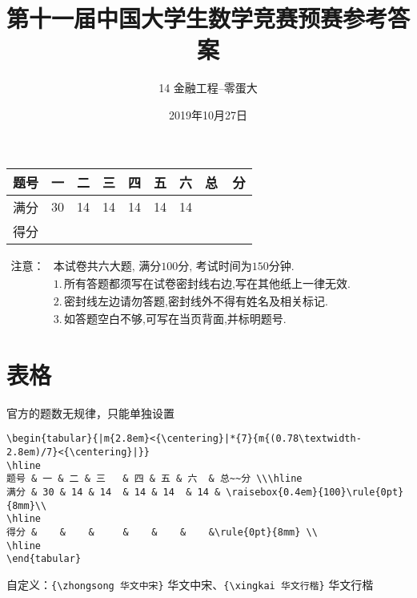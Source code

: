\documentclass[11pt,twoside]{article} %
\title{第十一届中国大学生数学竞赛预赛参考答案}
\author{14 金融工程--零蛋大}
\date{2019年10月27日}
\begin{document}
\maketitle
\begin{flushleft}
\begin{tabular}{|m{2.8em}<{\centering}|*{7}{m{}<{\centering}|}}
\hline
题号 & 一 & 二 & 三   & 四 & 五 & 六  & 总~~分 \\\hline
满分 & 30 & 14 & 14  & 14 & 14  & 14 & \raisebox{0.4em}{100}\rule{0pt}{8mm}\\
\hline
得分 &    &    &     &    &    &    &\rule{0pt}{8mm} \\
\hline		
\end{tabular}\vspace*{0.6em}		
$\begin{aligned}
\mbox{注意：}
&\text{本试卷共六大题, 满分100分, 考试时间为150分钟.}\\
&1.\,\mbox{所有答题都须写在试卷密封线右边,写在其他纸上一律无效}.\\
&2.\,\mbox{密封线左边请勿答题,密封线外不得有姓名及相关标记}.\\
&3.\,\mbox{如答题空白不够,可写在当页背面,并标明题号}.
\end{aligned}$		
\end{flushleft}
\setlength{\marginparsep}{-0.8cm}
	

\section{表格}
官方的题数无规律，只能单独设置
\begin{lstlisting}[style=tsdtex]
\begin{tabular}{|m{2.8em}<{\centering}|*{7}{m{(0.78\textwidth-2.8em)/7}<{\centering}|}}
\hline
题号 & 一 & 二 & 三   & 四 & 五 & 六  & 总~~分 \\\hline
满分 & 30 & 14 & 14  & 14 & 14  & 14 & \raisebox{0.4em}{100}\rule{0pt}{8mm}\\
\hline
得分 &    &    &     &    &    &    &\rule{0pt}{8mm} \\
\hline		
\end{tabular}
\end{lstlisting}

\item 自定义：\lstinline[style=iltx]|{\zhongsong 华文中宋}| {\zhongsong 华文中宋}、\lstinline[style=iltx]|{\xingkai 华文行楷}| {\xingkai 华文行楷}
\end{document}
